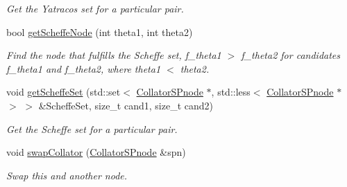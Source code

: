 \begin{DoxyCompactItemize}
\begin{DoxyCompactList}\small\item\em \-Get the \-Yatracos set for a particular pair. \end{DoxyCompactList}\item 
bool \hyperlink{classsubpavings_1_1CollatorSPnode_a9509d8f49407c1b14148f80758f02646}{get\-Scheffe\-Node} (int theta1, int theta2)
\begin{DoxyCompactList}\small\item\em \-Find the node that fulfills the \-Scheffe set, f\-\_\-theta1 $>$ f\-\_\-theta2 for candidates f\-\_\-theta1 and f\-\_\-theta2, where theta1 $<$ theta2. \end{DoxyCompactList}\item 
void \hyperlink{classsubpavings_1_1CollatorSPnode_a3c3d4df6f965a2eee9b4c517eb045246}{get\-Scheffe\-Set} (std\-::set$<$ \hyperlink{classsubpavings_1_1CollatorSPnode}{\-Collator\-S\-Pnode} $\ast$, std\-::less$<$ \hyperlink{classsubpavings_1_1CollatorSPnode}{\-Collator\-S\-Pnode} $\ast$ $>$ $>$ \&\-Scheffe\-Set, size\-\_\-t cand1, size\-\_\-t cand2)
\begin{DoxyCompactList}\small\item\em \-Get the \-Scheffe set for a particular pair. \end{DoxyCompactList}\item 
void \hyperlink{classsubpavings_1_1CollatorSPnode_a3b6cd985321d1ecae0a856ab881d6e62}{swap\-Collator} (\hyperlink{classsubpavings_1_1CollatorSPnode}{\-Collator\-S\-Pnode} \&spn)
\begin{DoxyCompactList}\small\item\em \-Swap this and another node. \end{DoxyCompactList}\end{DoxyCompactItemize}
